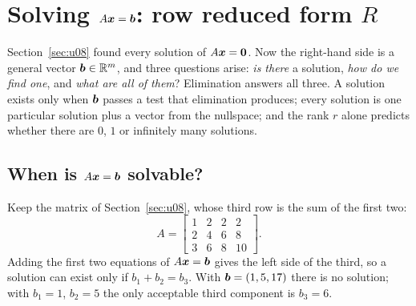 \section{\texorpdfstring{Solving \(A\boldsymbol{x}=\boldsymbol{b}\): row reduced form \(R\)}{Solving Ax = b: row reduced form R}}\label{sec:u09}

Section~\ref{sec:u08} found every solution of $A\boldsymbol{x}=\boldsymbol{0}$. Now the right-hand side is a
general vector $\boldsymbol{b}\in\mathbb{R}^m$, and three questions arise: \emph{is there} a solution, \emph{how
do we find one}, and \emph{what are all of them}? Elimination answers all three. A solution
exists only when $\boldsymbol{b}$ passes a test that elimination produces; every solution is one
particular solution plus a vector from the nullspace; and the rank $r$ alone predicts whether there
are $0$, $1$ or infinitely many solutions.

\subsection{When is \texorpdfstring{\(A\boldsymbol{x}=\boldsymbol{b}\)}{Ax = b} solvable?}

Keep the matrix of Section~\ref{sec:u08}, whose third row is the sum of the first two:
\[
A=\begin{bmatrix}1&2&2&2\\2&4&6&8\\3&6&8&10\end{bmatrix}.
\]
Adding the first two equations of $A\boldsymbol{x}=\boldsymbol{b}$ gives the left side of the third, so a solution
can exist only if $b_1+b_2=b_3$. With $\boldsymbol{b}=(1,5,17)$ there is no solution; with $b_1=1$, $b_2=5$
the only acceptable third component is $b_3=6$.

